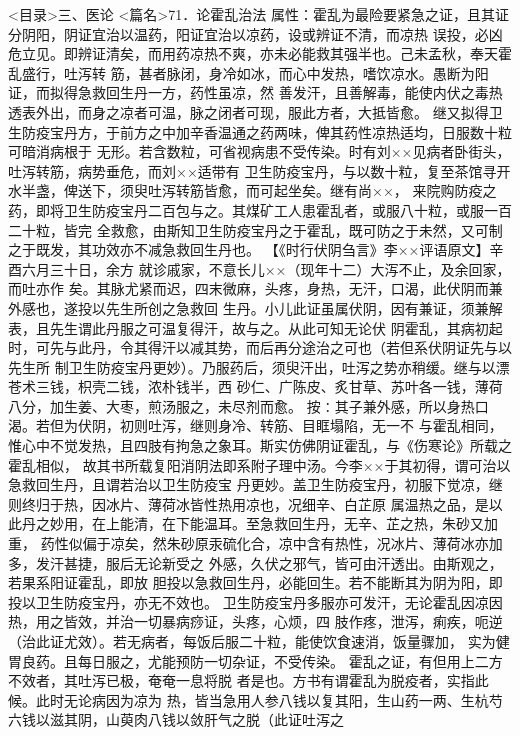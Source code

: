 \documentclass[a4paper,12pt,UTF8,twoside]{ctexbook}
\begin{document}
<目录>三、医论
<篇名>71．论霍乱治法
属性：霍乱为最险要紧急之证，且其证分阴阳，阴证宜治以温药，阳证宜治以凉药，设或辨证不清，而凉热 
误投，必凶危立见。即辨证清矣，而用药凉热不爽，亦未必能救其强半也。己未孟秋，奉天霍乱盛行，吐泻转 
筋，甚者脉闭，身冷如冰，而心中发热，嗜饮凉水。愚断为阳证，而拟得急救回生丹一方，药性虽凉，然 
善发汗，且善解毒，能使内伏之毒热透表外出，而身之凉者可温，脉之闭者可现，服此方者，大抵皆愈。 
继又拟得卫生防疫宝丹方，于前方之中加辛香温通之药两味，俾其药性凉热适均，日服数十粒可暗消病根于 
无形。若含数粒，可省视病患不受传染。时有刘××见病者卧街头，吐泻转筋，病势垂危，而刘××适带有 
卫生防疫宝丹，与以数十粒，复至茶馆寻开水半盏，俾送下，须臾吐泻转筋皆愈，而可起坐矣。继有尚××， 
来院购防疫之药，即将卫生防疫宝丹二百包与之。其煤矿工人患霍乱者，或服八十粒，或服一百二十粒，皆完 
全救愈，由斯知卫生防疫宝丹之于霍乱，既可防之于未然，又可制之于既发，其功效亦不减急救回生丹也。 
【《时行伏阴刍言》李××评语原文】辛酉六月三十日，余方 
就诊戚家，不意长儿××（现年十二）大泻不止，及余回家，而吐亦作 
矣。其脉尤紧而迟，四末微麻，头疼，身热，无汗，口渴，此伏阴而兼外感也，遂投以先生所创之急救回 
生丹。小儿此证虽属伏阴，因有兼证，须兼解表，且先生谓此丹服之可温复得汗，故与之。从此可知无论伏 
阴霍乱，其病初起时，可先与此丹，令其得汗以减其势，而后再分途治之可也（若但系伏阴证先与以先生所 
制卫生防疫宝丹更妙）。乃服药后，须臾汗出，吐泻之势亦稍缓。继与以漂苍术三钱，枳壳二钱，浓朴钱半，西 
砂仁、广陈皮、炙甘草、苏叶各一钱，薄荷八分，加生姜、大枣，煎汤服之，未尽剂而愈。 
按∶其子兼外感，所以身热口渴。若但为伏阴，初则吐泻，继则身冷、转筋、目眶塌陷，无一不 
与霍乱相同，惟心中不觉发热，且四肢有拘急之象耳。斯实仿佛阴证霍乱，与《伤寒论》所载之霍乱相似， 
故其书所载复阳消阴法即系附子理中汤。今李××于其初得，谓可治以急救回生丹，且谓若治以卫生防疫宝 
丹更妙。盖卫生防疫宝丹，初服下觉凉，继则终归于热，因冰片、薄荷冰皆性热用凉也，况细辛、白芷原 
属温热之品，是以此丹之妙用，在上能清，在下能温耳。至急救回生丹，无辛、芷之热，朱砂又加重， 
药性似偏于凉矣，然朱砂原汞硫化合，凉中含有热性，况冰片、薄荷冰亦加多，发汗甚捷，服后无论新受之 
外感，久伏之邪气，皆可由汗透出。由斯观之，若果系阳证霍乱，即放 
胆投以急救回生丹，必能回生。若不能断其为阴为阳，即投以卫生防疫宝丹，亦无不效也。 
卫生防疫宝丹多服亦可发汗，无论霍乱因凉因热，用之皆效，并治一切暴病痧证，头疼，心烦，四 
肢作疼，泄泻，痢疾，呃逆（治此证尤效）。若无病者，每饭后服二十粒，能使饮食速消，饭量骤加， 
实为健胃良药。且每日服之，尤能预防一切杂证，不受传染。 
霍乱之证，有但用上二方不效者，其吐泻已极，奄奄一息将脱 
者是也。方书有谓霍乱为脱疫者，实指此候。此时无论病因为凉为 
热，皆当急用人参八钱以复其阳，生山药一两、生杭芍六钱以滋其阴，山萸肉八钱以敛肝气之脱（此证吐泻之 
\end{document}
